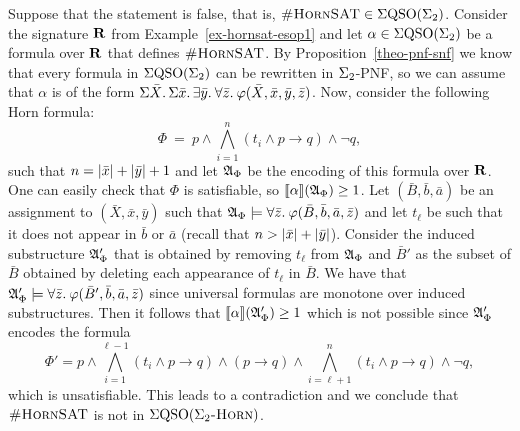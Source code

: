 Suppose that the statement is false, that is, $\textsc{\#HornSAT} \in \Sigma{\rm QSO}(\Sigma_{2})$. Consider the signature $\mathbf{R}$ from Example~\ref{ex-hornsat-esop1} and let $\alpha \in \Sigma{\rm QSO}(\Sigma_{2})$ be a formula over $\mathbf{R}$ that defines $\textsc{\#HornSAT}$. By Proposition~\ref{theo-pnf-snf} we know that every formula in $\Sigma{\rm QSO}(\Sigma_{2})$ can be rewritten in $\Sigma_{2}$-PNF, so we can assume that $\alpha$ is of the form $\Sigma{\bar{X}}.\,\Sigma{\bar{x}}.\, \exists{\bar{y}}.\: \forall{\bar{z}}.\:\varphi(\bar{X},\bar{x},\bar{y},\bar{z})$. Now, consider the following Horn formula:
$$
\Phi \ = \ p \wedge \bigwedge_{i = 1}^n (t_i \wedge p \to q) \wedge \neg q,
$$
such that $n = \vert \bar{x} \vert + \vert \bar{y} \vert + 1$ and let $\mathfrak{A}_{\Phi}$ be the encoding of this formula over $\mathbf{R}$. 
One can easily check that $\Phi$ is satisfiable, so ${\llbracket{}{\alpha}\rrbracket}(\mathfrak{A}_{\Phi}) \geq 1$. Let $(\bar{B},\bar{b},\bar{a})$ be an assignment to $(\bar{X},\bar{x},\bar{y})$ such that $\mathfrak{A}_{\Phi} \models \forall{\bar{z}}.\: \varphi(\bar{B},\bar{b},\bar{a},\bar{z})$ and let $t_{\ell}$ be such that it does not appear in $\bar{b}$ or $\bar{a}$ (recall that $n > \vert \bar{x} \vert + \vert \bar{y} \vert$). Consider the induced substructure $\mathfrak{A}_{\Phi}'$ that is obtained by removing $t_{\ell}$ from $\mathfrak{A}_{\Phi}$ and $\bar{B}'$ as the subset of $\bar{B}$ obtained by deleting each appearance of $t_{\ell}$ in $\bar{B}$. We have that $\mathfrak{A}_{\Phi}'\models \forall{\bar{z}}.\:\varphi(\bar{B}',\bar{b},\bar{a},\bar{z})$ since universal formulas are monotone over induced substructures. Then it follows that ${\llbracket{}{\alpha}\rrbracket}(\mathfrak{A}_{\Phi}') \geq 1$ which is not possible since $\mathfrak{A}_{\Phi}'$ encodes the formula
$$
\Phi' = p \wedge \bigwedge_{i = 1}^{\ell-1} (t_i \wedge p \to q) \wedge (p\to q) \wedge \bigwedge_{i = \ell+1}^{n} (t_i \wedge p \to q) \wedge \neg q,
$$
which is unsatisfiable. This leads to a contradiction and we conclude that $\textsc{\#HornSAT}$ is not in $\Sigma{\rm QSO}(\Sigma_2\textsc{-Horn})$.